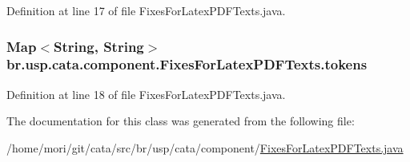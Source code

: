 Definition at line 17 of file Fixes\+For\+Latex\+P\+D\+F\+Texts.\+java.

\hypertarget{classbr_1_1usp_1_1cata_1_1component_1_1_fixes_for_latex_p_d_f_texts_a3e771995284966c4d9042e5af3ab461c}{
\subsubsection[{tokens}]{\setlength{\rightskip}{0pt plus 5cm}Map$<$String, String$>$ br.\+usp.\+cata.\+component.\+Fixes\+For\+Latex\+P\+D\+F\+Texts.\+tokens\hspace{0.3cm}{\ttfamily [static]}}}\label{classbr_1_1usp_1_1cata_1_1component_1_1_fixes_for_latex_p_d_f_texts_a3e771995284966c4d9042e5af3ab461c}


Definition at line 18 of file Fixes\+For\+Latex\+P\+D\+F\+Texts.\+java.



The documentation for this class was generated from the following file\+:\begin{DoxyCompactItemize}
\item 
/home/mori/git/cata/src/br/usp/cata/component/\hyperlink{_fixes_for_latex_p_d_f_texts_8java}{Fixes\+For\+Latex\+P\+D\+F\+Texts.\+java}\end{DoxyCompactItemize}
